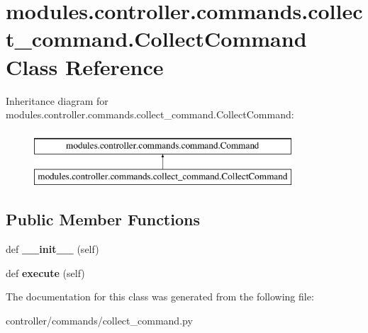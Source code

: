 \hypertarget{classmodules_1_1controller_1_1commands_1_1collect__command_1_1_collect_command}{}\section{modules.\+controller.\+commands.\+collect\+\_\+command.\+Collect\+Command Class Reference}
\label{classmodules_1_1controller_1_1commands_1_1collect__command_1_1_collect_command}
Inheritance diagram for modules.\+controller.\+commands.\+collect\+\_\+command.\+Collect\+Command\+:\begin{figure}[H]
\begin{center}
\leavevmode
\includegraphics[height=2.000000cm]{classmodules_1_1controller_1_1commands_1_1collect__command_1_1_collect_command}
\end{center}
\end{figure}
\subsection*{Public Member Functions}
\begin{DoxyCompactItemize}
\item 
\mbox{\label{classmodules_1_1controller_1_1commands_1_1collect__command_1_1_collect_command_a4c513e554e72ad8da74c6799b055cf0b}} 
def {\bfseries \+\_\+\+\_\+init\+\_\+\+\_\+} (self)
\item 
\mbox{\label{classmodules_1_1controller_1_1commands_1_1collect__command_1_1_collect_command_a0d745e40ea6422910fd294ebd9a51720}} 
def {\bfseries execute} (self)
\end{DoxyCompactItemize}


The documentation for this class was generated from the following file\+:\begin{DoxyCompactItemize}
\item 
controller/commands/collect\+\_\+command.\+py\end{DoxyCompactItemize}
